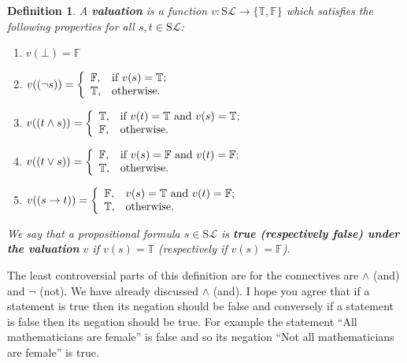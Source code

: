 \documentclass[11pt]{article}
\newcommand{\PF}{\mathrm{S}}
\newtheorem{definition}[theorem]{Definition}
\newcommand{\mcal}[1]{\mathcal{#1}}
\newcommand{\F}{\mathbb{F}}
\newcommand{\T}{\mathbb{T}}
\begin{document}
\begin{definition}
A \textbf{valuation} is a function $v:\PF\mcal{L}\rightarrow \{\T,\F\}$ which satisfies the following properties for all $s,t\in \PF\mcal{L}$:
\begin{enumerate}
\item $v(\bot)=\F$
\item $v((\neg s))=\left\{
                   \begin{array}{ll}
                     \F, & \hbox{if $v(s)=\T$;} \\
                     \T, & \hbox{otherwise.}
                   \end{array}
                 \right.
$
\item $v((t\wedge s))=\left\{
                      \begin{array}{ll}
                        \T, & \hbox{if $v(t)=\T$ and $v(s)=\T$;} \\
                        \F, & \hbox{otherwise.}
                      \end{array}
                    \right.
$
\item $v((t\vee s))=\left\{
        \begin{array}{ll}
          \F, & \hbox{if $v(s)=\F$ and $v(t)=\F$;} \\
          \T, & \hbox{otherwise.}
        \end{array}
      \right.
$
\item $v((s\rightarrow t))=\left\{
                           \begin{array}{ll}
                             \F, & \hbox{$v(s)=\T$ and $v(t)=\F$;} \\
                             \T, & \hbox{otherwise.}
                           \end{array}
                         \right.
$

\end{enumerate}

We say that a propositional formula $s\in\PF\mcal{L}$ is \textbf{true (respectively false) under the valuation} $v$ if $v(s)=\T$ (respectively if $v(s)=\F$).
\end{definition}

The least controversial parts of this definition are for the connectives are $\wedge$ (and) and $\neg$ (not). We have already discussed $\wedge$ (and). I hope you agree that if a statement is true then its negation should be false and conversely if a statement is false then its negation should be true. For example the statement ``All mathematicians are female'' is false and so its negation ``Not all mathematicians are female'' is true.
\end{document}
